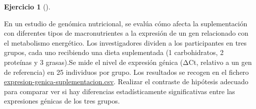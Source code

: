 \documentclass[
  a4paper,
]{scrreport}
\theoremstyle{definition}
\newtheorem{exercise}{Ejercicio}[chapter]
\theoremstyle{remark}
\begin{document}
\begin{exercise}[]\protect\hypertarget{exr-contraste-anova-suplementacion}{}\label{exr-contraste-anova-suplementacion}

En un estudio de genómica nutricional, se evalúa cómo afecta la
suplementación con diferentes tipos de macronutrientes a la expresión de
un gen relacionado con el metabolismo energético. Los investigadores
dividen a los participantes en tres grupos, cada uno recibiendo una
dieta suplementada (1 carbohidratos, 2 proteínas y 3 grasas).Se mide el
nivel de expresión génica (ΔCt, relativo a un gen de referencia) en 25
individuos por grupo. Los resultados se recogen en el fichero
\href{datos/expresion-genica-suplementacion.csv}{expresion-genica-suplementacion.csv}.
Realizar el contraste de hipótesis adecuado para comparar ver si hay
diferencias estadísticamente significativas entre las expresiones
génicas de los tres grupos.

\end{exercise}
\end{document}
